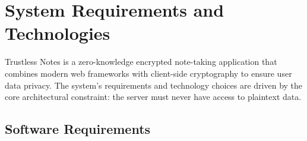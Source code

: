 
\chapter{System Requirements and Technologies}

Trustless Notes is a zero-knowledge encrypted note-taking application that combines modern web frameworks with client-side cryptography to ensure user data privacy. The system's requirements and technology choices are driven by the core architectural constraint: the server must never have access to plaintext data.

\section{Software Requirements}

